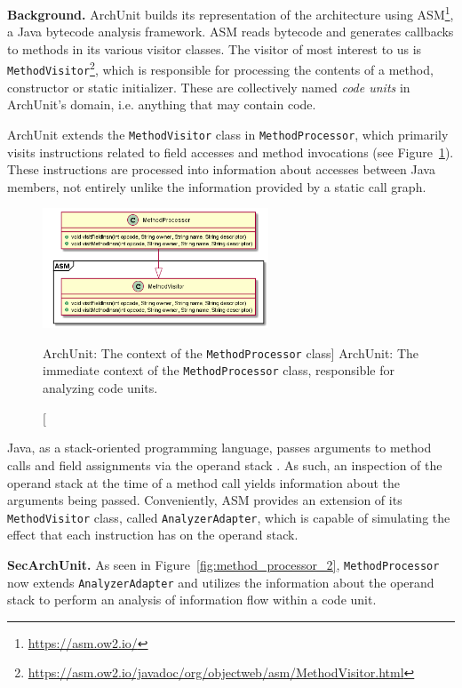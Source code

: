 \textbf{Background.} ArchUnit builds its representation of the architecture using ASM\footnote{\url{https://asm.ow2.io/}}, a Java bytecode analysis framework. ASM reads bytecode and generates callbacks to methods in its various visitor classes. 
The visitor of most interest to us is \texttt{MethodVisitor}\footnote{\url{https://asm.ow2.io/javadoc/org/objectweb/asm/MethodVisitor.html}}, which is responsible for processing the contents of a method, constructor or static initializer. These are collectively named \textit{code units} in ArchUnit's domain, i.e. anything that may contain code.

ArchUnit extends the \texttt{MethodVisitor} class in \texttt{MethodProcessor}, which primarily visits instructions related to field accesses and method invocations (see Figure~\ref{fig:method_processor_1}). These instructions are processed into information about accesses between Java members, not entirely unlike the information provided by a static call graph.

\begin{figure}[H]
    \centering
    \includegraphics[width=0.6\textwidth]{figure/extension/MethodProcessor1.png}
    \caption
        [ArchUnit: The context of the \texttt{MethodProcessor} class]
        {ArchUnit: The immediate context of the \texttt{MethodProcessor} class, responsible for analyzing code units.}
    \label{fig:method_processor_1}
\end{figure}

Java, as a stack-oriented programming language, passes arguments to method calls and field assignments via the operand stack \cite{hutchison_information_2005}. As such, an inspection of the operand stack at the time of a method call yields information about the arguments being passed.
Conveniently, ASM provides an extension of its \texttt{MethodVisitor} class, called \texttt{AnalyzerAdapter}, which is capable of simulating the effect that each instruction has on the operand stack.

\textbf{SecArchUnit.} As seen in Figure~\ref{fig:method_processor_2}, \texttt{MethodProcessor} now extends \texttt{Analyzer\-Adapter} and utilizes the information about the operand stack to perform an analysis of information flow within a code unit.

